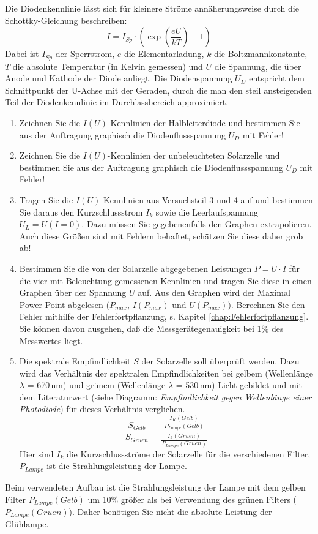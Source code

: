 Die Diodenkennlinie lässt sich für kleinere Ströme annäherungsweise durch die Schottky-Gleichung beschreiben:
\begin{equation}
I = I_{Sp}\cdot\left(\exp\left(\frac{eU}{kT}\right)-1\right)
\end{equation}
Dabei ist $I_{Sp}$ der Sperrstrom, $e$ die Elementarladung, $k$ die Boltzmannkonstante, $T$ die absolute Temperatur (in Kelvin gemessen) und $U$ die Spannung, die über Anode und Kathode der Diode anliegt. Die Diodenspannung $U_D$ entspricht dem Schnittpunkt der U-Achse mit der Geraden, durch die man den steil ansteigenden Teil der Diodenkennlinie im Durchlassbereich approximiert.

\begin{enumerate}
	\item Zeichnen Sie die $I(U)$-Kennlinien der Halbleiterdiode und bestimmen Sie aus der Auftragung graphisch die Diodenflussspannung $U_D$ mit Fehler!
	\item Zeichnen Sie die $I(U)$-Kennlinien der unbeleuchteten Solarzelle und bestimmen Sie aus der Auftragung graphisch die Diodenflussspannung $U_D$ mit Fehler!
	\item Tragen Sie die $I(U)$-Kennlinien aus Versuchsteil 3 und 4 auf und bestimmen Sie daraus den Kurzschlussstrom $I_k$ sowie die Leerlaufspannung $U_L = U (I = 0)$. Dazu müssen Sie gegebenenfalls den Graphen extrapolieren. 	
		Auch diese Größen sind mit Fehlern behaftet, schätzen Sie diese daher grob ab!
	\item Bestimmen Sie die von der Solarzelle abgegebenen Leistungen $P = U \cdot I$ für die vier mit Beleuchtung gemessenen Kennlinien und tragen Sie diese in einen Graphen über der Spannung $U$ auf. Aus den Graphen wird der Maximal Power Point abgelesen $(P_{max}$, $I(P_{max})$ und $U(P_{max}))$. Berechnen Sie den Fehler mithilfe der Fehlerfortpflanzung, s. Kapitel \ref{chap:Fehlerfortpflanzung}. Sie können davon ausgehen, daß die Messgerätegenauigkeit bei 1\% des Messwertes liegt.
	\item Die spektrale Empfindlichkeit $S$ der Solarzelle soll überprüft werden. Dazu wird das Verhältnis der spektralen Empfindlichkeiten bei gelbem (Wellenlänge $\lambda$ = 670\,nm) und grünem (Wellenlänge $\lambda$ = 530\,nm) Licht gebildet und mit dem Literaturwert (siehe Diagramm: \textit{Empfindlichkeit gegen Wellenlänge einer Photodiode}) für dieses Verhältnis verglichen.
		\begin{equation}
			\frac{S_{Gelb}}{S_{Gruen}}=\frac{\frac{I_K(Gelb)}{P_{Lampe}(Gelb)}}{\frac{I_k(Gruen)}{P_{Lampe}(Gruen)}}
		\end{equation}
		Hier sind $I_k$ die Kurzschlussströme der Solarzelle für die verschiedenen Filter, $P_{Lampe}$ ist die Strahlungsleistung der Lampe.
\end{enumerate}
Beim verwendeten Aufbau ist die Strahlungsleistung der Lampe mit dem gelben Filter $P_{Lampe}(Gelb)$ um 10\% größer als bei Verwendung des grünen Filters ($P_{Lampe}(Gruen)$). Daher benötigen Sie nicht die absolute Leistung der Glühlampe.

